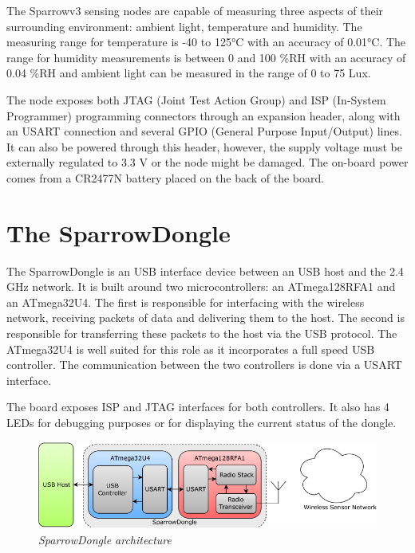 The Sparrowv3 sensing nodes are capable of measuring three aspects of their
surrounding environment: ambient light, temperature and humidity. The measuring
range for temperature is -40 to 125°C with an accuracy of 0.01°C. The range for
humidity measurements is between 0 and 100 \%RH with an accuracy of 0.04 \%RH
and ambient light can be measured in the range of 0 to 75 Lux.

The node exposes both JTAG (Joint Test Action Group) and ISP (In-System
Programmer) programming connectors through an expansion header, along with an
USART connection and several GPIO (General Purpose Input/Output) lines. It can
also be powered through this header, however, the supply voltage must be
externally regulated to 3.3 V or the node might be damaged.  The on-board power
comes from a CR2477N battery placed on the back of the board.

\section{The SparrowDongle}

The SparrowDongle is an USB interface device between an USB host and the 2.4
GHz network. It is built around two microcontrollers: an \mbox{ATmega128RFA1}
and an \mbox{ATmega32U4}\cite{atmega32u4}. The first is responsible for
interfacing with the wireless network, receiving packets of data and delivering
them to the host.  The second is responsible for transferring these packets to
the host via the USB protocol.  The \mbox{ATmega32U4} is well suited for this
role as it incorporates a full speed USB controller. The communication between
the two controllers is done via a USART interface.

The board exposes ISP and JTAG interfaces for both controllers. It also has 4
LEDs for debugging purposes or for displaying the current status of the dongle.

\begin{figure}[ht]
	\begin{center}
		\includegraphics[width=\textwidth]{img/sparrowdongle.pdf}
	\end{center}
	\caption{\small \itshape{SparrowDongle architecture}}
\end{figure}


